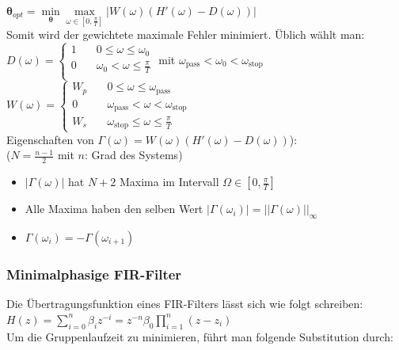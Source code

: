 \documentclass[a4paper,landscape,6pt]{article}
\renewcommand{\vec}[1]{\ensuremath{\boldsymbol {#1}}}							%
\begin{document}
\begin{multicols}{3}
$\vec \theta_{opt} = \min\limits_{\vec \theta} \max\limits_{\omega \in [0,\frac{\pi}{T}]} | W(\omega)(H'(\omega) - D(\omega))|$\\

Somit wird der gewichtete maximale Fehler minimiert. Üblich wählt man:\\

$D(\omega) = \left\{
\begin{array}{ll}
1 & \quad 0 \le \omega \le \omega_0 \\
0 & \quad  \omega_0 < \omega \le \frac{\pi}{T} \\
\end{array} \right.
$ mit $\omega_{\text{pass}} < \omega_0 < \omega_{\text{stop}}$\\

$W(\omega) = \left\{
\begin{array}{cl}
W_p & \quad 0 \le \omega \le \omega_{\text{pass}} \\
0 & \quad  \omega_{\text{pass}} < \omega < \omega_{\text{stop}} \\
W_s & \quad \omega_{\text{stop}} \le \omega \le \frac{\pi}{T}
\end{array} \right.
$\\

Eigenschaften von $\Gamma(\omega) = W(\omega)(H'(\omega) - D(\omega))$):\\($N=\frac{n-1}{2}$ mit $n$: Grad des Systems)
	\begin{itemize}
		\item $|\Gamma(\omega)|$ hat $N+2$ Maxima im Intervall $\Omega \in [0,\frac{\pi}{T}]$
		\item Alle Maxima haben den selben Wert $|\Gamma(\omega_i)| = ||\Gamma(\omega)||_{\infty}$
		\item $\Gamma(\omega_i) = -\Gamma(\omega_{i+1})$
	\end{itemize}

\subsubsection*{Minimalphasige FIR-Filter}
Die Übertragungsfunktion eines FIR-Filters lässt sich wie folgt schreiben:\\
$H(z) = \sum\limits_{i=0}^n \beta_i z^{-i} = z^{-n} \beta_0 \prod\limits_{i=1}^n (z-z_i) $\\
Um die Gruppenlaufzeit zu minimieren, führt man folgende Substitution durch:\\


\end{multicols}
\end{document}
